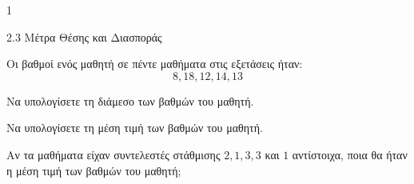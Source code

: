 \begin{ylh}{1}
	\item 2.3 Μέτρα Θέσης και Διασποράς
\end{ylh}
Οι βαθμοί ενός μαθητή σε πέντε μαθήματα στις εξετάσεις ήταν:
\[ 8, 18, 12, 14, 13 \]
\begin{alist}
	\item Να υπολογίσετε τη διάμεσο των βαθμών του μαθητή. 
	\item Να υπολογίσετε τη μέση τιμή των βαθμών του μαθητή. 
	\item Αν τα μαθήματα είχαν συντελεστές στάθμισης $2, 1, 3, 3$ και $1$ αντίστοιχα, ποια θα ήταν η μέση τιμή των βαθμών του μαθητή; 
\end{alist}

